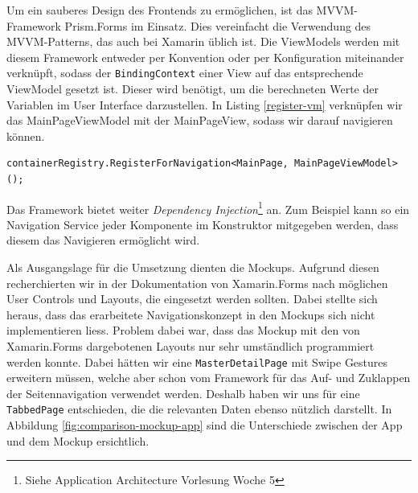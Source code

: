Um ein sauberes Design des Frontends zu ermöglichen, ist das MVVM\--Framework Prism.Forms \cite{prism} im Einsatz. Dies vereinfacht die Verwendung des MVVM-Patterns, das auch bei Xamarin üblich ist. Die ViewModels werden mit diesem Framework entweder per Konvention oder per Konfiguration miteinander verknüpft, sodass der \texttt{BindingContext} einer View auf das entsprechende ViewModel gesetzt ist. Dieser wird benötigt, um die berechneten Werte der Variablen im User Interface darzustellen. In Listing \ref{register-vm} verknüpfen wir das MainPageViewModel mit der MainPageView, sodass wir darauf navigieren können. 

\begin{lstlisting}[label=register-vm,caption=Verknüpfung von View mit ViewModel in Prism.Forms]
containerRegistry.RegisterForNavigation<MainPage, MainPageViewModel>();
\end{lstlisting}

Das Framework bietet weiter \textit{Dependency Injection}\footnote{Siehe Application Architecture Vorlesung Woche 5} an. Zum Beispiel kann so ein Navigation Service jeder Komponente im Konstruktor mitgegeben werden, dass diesem das Navigieren ermöglicht wird. 

Als Ausgangslage für die Umsetzung dienten die Mockups. Aufgrund diesen recherchierten wir in der Dokumentation von Xamarin.Forms nach möglichen User Controls und Layouts, die eingesetzt werden sollten. Dabei stellte sich heraus, dass das erarbeitete Navigationskonzept in den Mockups sich nicht implementieren liess. Problem dabei war, dass das Mockup mit den von Xamarin.Forms dargebotenen Layouts nur sehr umständlich programmiert werden konnte. Dabei hätten wir eine \texttt{MasterDetailPage} mit Swipe Gestures erweitern müssen, welche aber schon vom Framework für das Auf- und Zuklappen der Seitennavigation verwendet werden. Deshalb haben wir uns für eine \texttt{TabbedPage} entschieden, die die relevanten Daten ebenso nützlich darstellt. In Abbildung \ref{fig:comparison-mockup-app} sind die Unterschiede zwischen  der App und dem Mockup ersichtlich.

